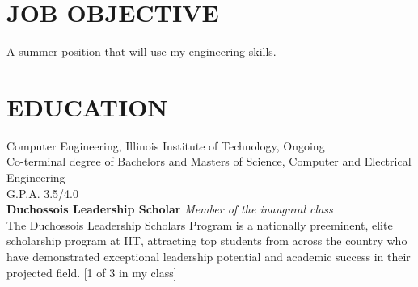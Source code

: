 \documentclass{res}
\begin{document}
 

\address{\bf  PRESENT ADDRESS\\Box 2032 \\3201 S. State St.\\Chicago, IL 60616\\(630) 450-5725}
\address{\bf PERMANENT ADDRESS \\2558 Breckeridge Ct.\\Aurora, IL 60504 \\  (630) 978-1952}
                                  
\begin{resume}

\section{JOB OBJECTIVE}          
    A summer position that will use my engineering skills.
 
\section{EDUCATION}          
    Computer Engineering, Illinois Institute of Technology, Ongoing\\
    Co-terminal degree of Bachelors and Masters of Science, Computer and Electrical Engineering\\       
    G.P.A. 3.5/4.0\\
    {\bf Duchossois Leadership Scholar} \emph{Member of the inaugural class}\\
  The Duchossois Leadership Scholars Program is a nationally preeminent, elite scholarship program at IIT, attracting top students from across the country who have demonstrated exceptional leadership potential and academic success in their projected field. [1 of 3 in my class]
 

\end{resume}
\end{document}
